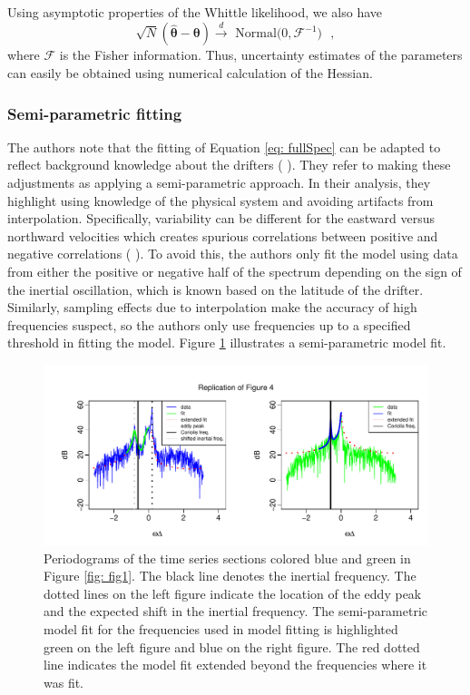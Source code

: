 \documentclass{stat572Style}
\newcommand{\vmcomment}[1]{({\color{blue}{VM's comment:}} \textbf{\color{blue}{#1}})}
\begin{document}
Using asymptotic properties of the Whittle likelihood, we also have 
\begin{equation}
\label{eq: fisher}
\sqrt{N}(\hat{\boldsymbol{\theta}} - \boldsymbol{\theta}) \overset{d}{\rightarrow} \text{ Normal($0, \boldsymbol{\mathcal{F}}^{-1})$ },
\end{equation}
where $\boldsymbol{\mathcal{F}}$ is the Fisher information. 
Thus, uncertainty estimates of the parameters can easily be obtained using numerical calculation of the Hessian. 

\subsubsection{Semi-parametric fitting}
\label{sec: semi}
The authors note that the fitting of Equation \eqref{eq: fullSpec} can be adapted to reflect background knowledge about the drifters \vmcomment{I don't like the phrase "fitting of Equation (17).}. 
They refer to making these adjustments as applying a semi-parametric approach. 
In their analysis, they highlight using knowledge of the physical system and avoiding artifacts from interpolation. 
Specifically,  variability can be different for the eastward versus northward velocities  which creates spurious correlations between positive and negative correlations \vmcomment{correlations between correlations? just checking.}. 
To avoid this, the authors only fit the model using data from either the positive or negative half of the spectrum depending on the sign of the inertial oscillation, which is known based on the latitude of the drifter.  
Similarly, sampling effects due to interpolation make the accuracy of high frequencies suspect, so the authors only use frequencies up to a specified threshold in fitting the model. Figure \ref{fig: fig4} illustrates a semi-parametric model fit. 

\begin{figure}[h!]
  \centering
    \includegraphics[width=\textwidth]{ReplicatedFigures/fig4.pdf}
        \caption{Periodograms of the time series sections colored blue and green in Figure \ref{fig: fig1}. The black line denotes the inertial frequency.   The dotted lines on the left figure indicate the location of the eddy peak and the expected shift in the inertial frequency. The semi-parametric model fit for the frequencies used in model fitting is highlighted green on the left figure and blue on the right figure. The red dotted line indicates the model fit extended beyond the frequencies where it was fit. }
        	\label{fig: fig4}
\end{figure}
\end{document}
